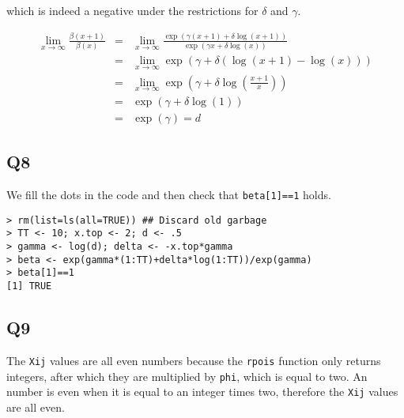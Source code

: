 \documentclass[11pt]{article}
\begin{document}
which is indeed a negative under the restrictions for $\delta$ and $\gamma$.

\begin{eqnarray}
\lim_{x \to \infty} \frac{\beta(x+1)}{\beta(x)} &=& \lim_{x \to \infty} \frac{\exp(\gamma (x+1) + \delta \log(x+1))}{\exp(\gamma x + \delta \log(x))} \\
&=& \lim_{x \to \infty}  \exp(\gamma + \delta(\log(x+1) - \log(x))) \\
&=& \lim_{x \to \infty}  \exp(\gamma + \delta\log\left(\frac{x+1}{x}\right)) \\
&=&\exp(\gamma + \delta\log\left(1\right)) \\
&=&\exp(\gamma) = d
\end{eqnarray}

\subsection*{Q8}

We fill the dots in the code and then check that \verb|beta[1]==1| holds.

\begin{verbatim}
> rm(list=ls(all=TRUE)) ## Discard old garbage
> TT <- 10; x.top <- 2; d <- .5
> gamma <- log(d); delta <- -x.top*gamma
> beta <- exp(gamma*(1:TT)+delta*log(1:TT))/exp(gamma)
> beta[1]==1
[1] TRUE
\end{verbatim}

\subsection*{Q9}

The \verb|Xij| values are all even numbers because the \verb|rpois| function only returns integers, after which they are multiplied by \verb|phi|, which is equal to two. An number is even when it is equal to an integer times two, therefore the \verb|Xij| values are all even.
\end{document}
